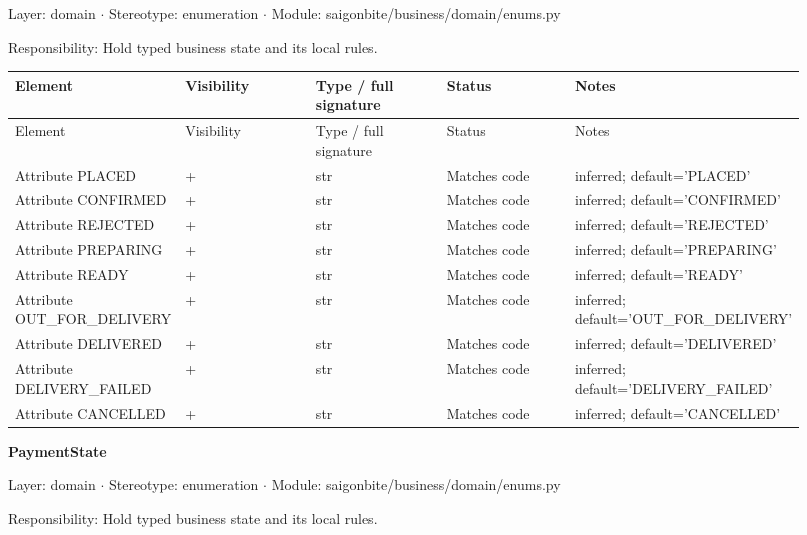 Layer: domain \ensuremath{\cdot} Stereotype: \guillemotleft{}enumeration\guillemotright{} \ensuremath{\cdot} Module: saigonbite/business/domain/enums.py

Responsibility: Hold typed business state and its local rules.

\begin{longtable}{>{\raggedright\arraybackslash}p{0.1840\linewidth}>{\raggedright\arraybackslash}p{0.1840\linewidth}>{\raggedright\arraybackslash}p{0.1840\linewidth}>{\raggedright\arraybackslash}p{0.1840\linewidth}>{\raggedright\arraybackslash}p{0.1840\linewidth}}
Element & Visibility & Type / full signature & Status & Notes \\
\hline\endfirsthead
Element & Visibility & Type / full signature & Status & Notes \\
\hline\endhead
Attribute PLACED & + & str & Matches code & inferred; default='PLACED' \\
Attribute CONFIRMED & + & str & Matches code & inferred; default='CONFIRMED' \\
Attribute REJECTED & + & str & Matches code & inferred; default='REJECTED' \\
Attribute PREPARING & + & str & Matches code & inferred; default='PREPARING' \\
Attribute READY & + & str & Matches code & inferred; default='READY' \\
Attribute OUT\_FOR\_DELIVERY & + & str & Matches code & inferred; default='OUT\_FOR\_DELIVERY' \\
Attribute DELIVERED & + & str & Matches code & inferred; default='DELIVERED' \\
Attribute DELIVERY\_FAILED & + & str & Matches code & inferred; default='DELIVERY\_FAILED' \\
Attribute CANCELLED & + & str & Matches code & inferred; default='CANCELLED' \\
\end{longtable}
\textbf{PaymentState}

Layer: domain \ensuremath{\cdot} Stereotype: \guillemotleft{}enumeration\guillemotright{} \ensuremath{\cdot} Module: saigonbite/business/domain/enums.py

Responsibility: Hold typed business state and its local rules.

